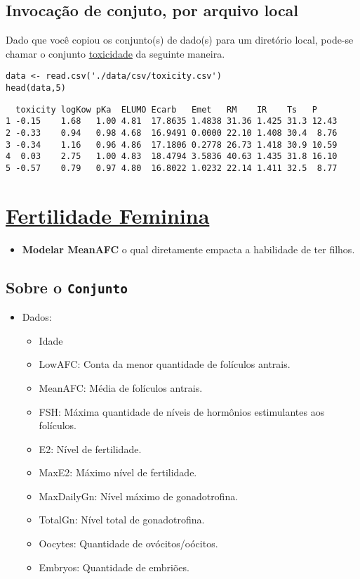 \documentclass[12pt]{abntex2}
\begin{document}
\subsection{Invocação de conjuto, por arquivo local}
\label{sec:org8df62c1}

Dado que você copiou os conjunto(s) de dado(s) para um diretório
local, pode-se chamar o conjunto \href{https://drive.google.com/file/d/1dZE0wj0Z-FeXCvz-4ft0CPJ6Enn1fnew/view?usp=sharing}{toxicidade} da seguinte maneira.

\begin{verbatim}
data <- read.csv('./data/csv/toxicity.csv')
head(data,5)
\end{verbatim}

\begin{verbatim}
  toxicity logKow pKa  ELUMO Ecarb   Emet   RM    IR    Ts   P    
1 -0.15    1.68   1.00 4.81  17.8635 1.4838 31.36 1.425 31.3 12.43
2 -0.33    0.94   0.98 4.68  16.9491 0.0000 22.10 1.408 30.4  8.76
3 -0.34    1.16   0.96 4.86  17.1806 0.2778 26.73 1.418 30.9 10.59
4  0.03    2.75   1.00 4.83  18.4794 3.5836 40.63 1.435 31.8 16.10
5 -0.57    0.79   0.97 4.80  16.8022 1.0232 22.14 1.411 32.5  8.77
\end{verbatim}

\section{\href{https://r-data.pmagunia.com/dataset/r-dataset-package-stat2data-fertility}{Fertilidade Feminina}}
\label{sec:org24d7a94}
\begin{itemize}
\item \textbf{Modelar MeanAFC} o qual diretamente empacta a habilidade de ter filhos.
\end{itemize}
\subsection{Sobre o \texttt{Conjunto}}
\label{sec:orgfaec0e1}
\begin{itemize}
\item Dados:
\begin{itemize}
\item Idade
\item LowAFC: Conta da menor quantidade de folículos antrais.
\item MeanAFC: Média de folículos antrais.
\item FSH: Máxima quantidade de níveis de hormônios estimulantes aos folículos.
\item E2: Nível de fertilidade.
\item MaxE2: Máximo nível de fertilidade.
\item MaxDailyGn: Nível máximo de gonadotrofina.
\item TotalGn: Nível total de gonadotrofina.
\item Oocytes: Quantidade de ovócitos/oócitos.
\item Embryos: Quantidade de embriões.
\end{itemize}
\end{itemize}
\end{document}
